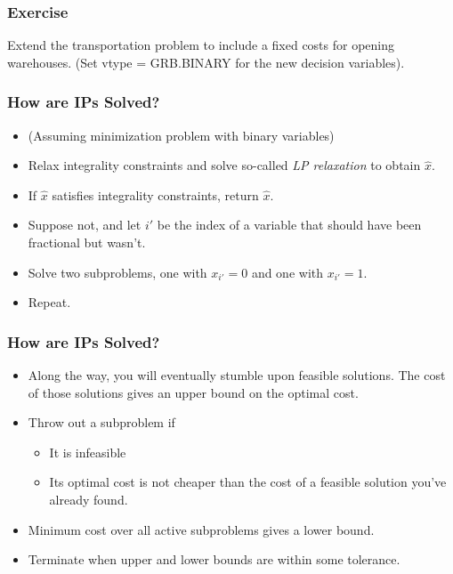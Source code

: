 \documentclass[12pt,handout]{beamer}
\begin{document}
\begin{frame}
\frametitle{Exercise}
Extend the transportation problem to include a fixed costs for opening warehouses. (Set vtype = GRB.BINARY for the new decision variables).
\end{frame}

\begin{frame}
\frametitle{How are IPs Solved?}
\begin{itemize}
\item (Assuming minimization problem with binary variables)
\item Relax integrality constraints and solve so-called {\em LP relaxation} to obtain $\hat{x}$.
\item If $\hat{x}$ satisfies integrality constraints, return $\hat{x}$.
\item Suppose not, and let $i'$ be the index of a variable that should have been fractional but wasn't.
\item Solve two subproblems, one with $x_{i'} = 0$ and one with $x_{i'} = 1$.
\item Repeat.
\end{itemize}
\end{frame}

\begin{frame}
\frametitle{How are IPs Solved?}
\begin{itemize}
\item Along the way, you will eventually stumble upon feasible solutions. The cost of those solutions gives an upper bound on the optimal cost.
\item Throw out a subproblem if
    \begin{itemize}
    \item It is infeasible
    \item Its optimal cost is not cheaper than the cost of a feasible solution you've already found.
    \end{itemize}
\item Minimum cost over all active subproblems gives a lower bound.
\item Terminate when upper and lower bounds are within some tolerance.
\end{itemize}
\end{frame}
\end{document}
